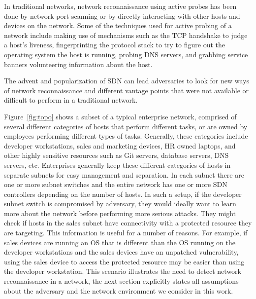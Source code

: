 In traditional networks, network reconnaissance using active probes has
been done by network port scanning or by directly interacting with other
hosts and devices on the network. Some of the techniques used for active
probing of a network include making use of mechanisms such as the TCP
handshake to judge a host's liveness, fingerprinting the protocol stack
to try to figure out the operating system the host is running, probing
DNS servers, and grabbing service banners volunteering information 
about the host.

The advent and popularization of SDN can lead adversaries to look for
new ways of network reconnaissance and different vantage points that
were not available or difficult to perform in a traditional network.

 Figure~\ref{fig:topo}
shows a subset of a typical enterprise network, comprised of several
different categories of hosts that perform different tasks, or are 
owned by employees performing different types of tasks. Generally, these
categories include developer workstations, sales and marketing devices,
HR owned laptops, and other highly sensitive resources such as Git 
servers, database servers, DNS servers, etc. Enterprises generally keep
these different categories of hosts in separate subnets for easy 
management and separation. In each subnet there are one or more subnet 
switches and the entire network has one or more SDN controllers
depending on the number of hosts. In such a setup, if the developer 
subnet switch is compromised by adversary, they would ideally want to 
learn more about the network before performing more serious attacks. 
They might check if hosts in the sales subnet have connectivity with a 
protected resource they are targeting. This information is useful for a 
number of reasons. For example, if sales devices are running an OS that 
is different than the OS running on the developer workstations and the
sales devices have an unpatched vulnerability, using the sales device to
access the protected resource may be easier than using the developer
workstation. This scenario illustrates the need to detect network
reconnaissance in a network, the next section explicitly states all
assumptions about the adversary and the network environment we consider
in this work.
